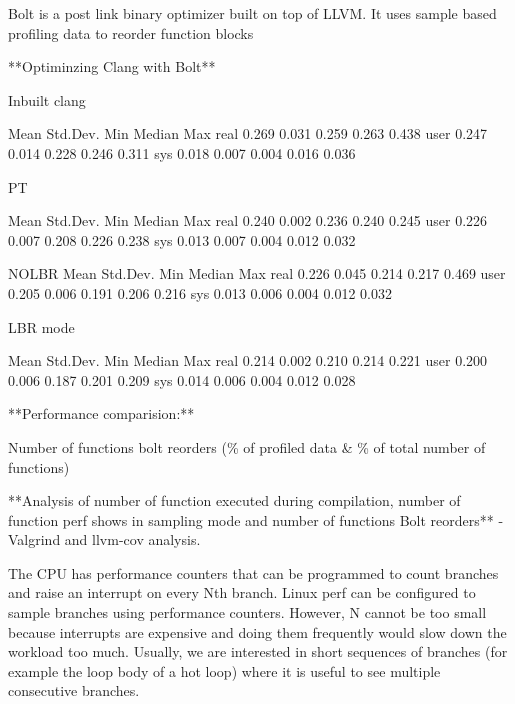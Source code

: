 Bolt is a post link binary optimizer built on top of LLVM. It uses sample based profiling data to reorder function blocks 

**Optiminzing Clang with Bolt** 

Inbuilt clang 

            Mean        Std.Dev.    Min         Median      Max
real        0.269       0.031       0.259       0.263       0.438       
user        0.247       0.014       0.228       0.246       0.311       
sys         0.018       0.007       0.004       0.016       0.036     


PT

            Mean        Std.Dev.    Min         Median      Max
real        0.240       0.002       0.236       0.240       0.245       
user        0.226       0.007       0.208       0.226       0.238       
sys         0.013       0.007       0.004       0.012       0.032    


NOLBR
            Mean        Std.Dev.    Min         Median      Max
real        0.226       0.045       0.214       0.217       0.469       
user        0.205       0.006       0.191       0.206       0.216       
sys         0.013       0.006       0.004       0.012       0.032  


LBR mode

            Mean        Std.Dev.    Min         Median      Max
real        0.214       0.002       0.210       0.214       0.221       
user        0.200       0.006       0.187       0.201       0.209       
sys         0.014       0.006       0.004       0.012       0.028    


**Performance comparision:**

Number of functions bolt reorders (\% of profiled data & \% of total number of functions)

**Analysis of number of function executed during compilation, number of function perf shows in sampling mode and number of functions Bolt reorders**
- Valgrind and llvm-cov analysis.

The CPU has performance counters that can be programmed to count branches and raise an interrupt on every Nth branch. Linux perf can be configured to sample branches using performance counters. However, N cannot be too small because interrupts are expensive and doing them frequently would slow down the workload too much. Usually, we are interested in short sequences of branches (for example the loop body of a hot loop) where it is useful to see multiple consecutive branches.




